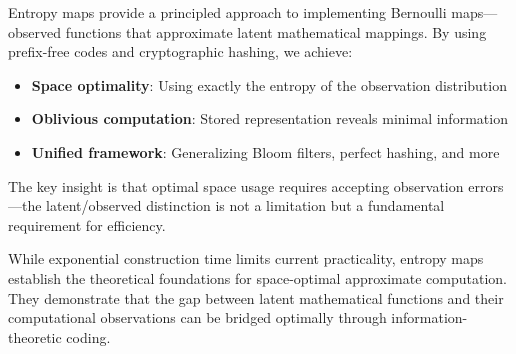 \documentclass[11pt,final,hidelinks]{article}
\begin{document}
Entropy maps provide a principled approach to implementing Bernoulli maps—observed functions that approximate latent mathematical mappings. By using prefix-free codes and cryptographic hashing, we achieve:

\begin{itemize}
    \item \textbf{Space optimality}: Using exactly the entropy of the observation distribution
    \item \textbf{Oblivious computation}: Stored representation reveals minimal information
    \item \textbf{Unified framework}: Generalizing Bloom filters, perfect hashing, and more
\end{itemize}

The key insight is that optimal space usage requires accepting observation errors—the latent/observed distinction is not a limitation but a fundamental requirement for efficiency.

While exponential construction time limits current practicality, entropy maps establish the theoretical foundations for space-optimal approximate computation. They demonstrate that the gap between latent mathematical functions and their computational observations can be bridged optimally through information-theoretic coding.




\end{document}
